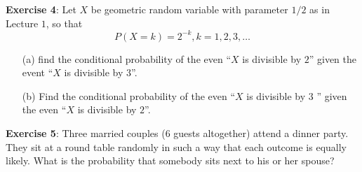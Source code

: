 \documentclass{article}
\begin{document}
\textbf{Exercise 4}: Let $X$ be geometric random variable with parameter $1/2$ as in Lecture $1$, so that 
    \begin{equation*}
        P(X = k) = 2^{-k}, k = 1, 2, 3, \ldots
    \end{equation*}
    \begin{itemize}
        \item [(a)] find the conditional probability of the even ``$X$ is divisible by $2$'' given the event ``$X$ is divisible by $3$''.

        \item [(b)] Find the conditional probability of the even ``$X$ is divisible by $3$ '' given the even ``$X$ is divisible by $2$''. 
    \end{itemize}

\textbf{Exercise 5}: Three married couples ($6$ guests altogether) attend a dinner party. They sit at a round table randomly in such a way that each outcome is equally likely. What is the probability that somebody sits next to his or her spouse?
\end{document}

